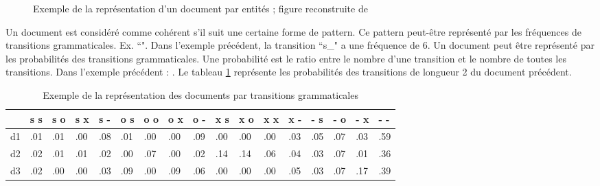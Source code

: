 \documentclass{KodeBook}
\begin{document}
\begin{figure}[!ht]
\begin{tabular}{ccccccccccccccccc}
	\end{tabular}
	
	\caption[Exemple de la représentation d'un document par entités]{Exemple de la représentation d'un document par entités ; figure reconstruite de \cite{2008-barzilay-lapata}}
	\label{fig:entity-grid-rep}
\end{figure}

%	

Un document est considéré comme cohérent s'il suit une certaine forme de pattern.
Ce pattern peut-être représenté par les fréquences de transitions grammaticales. Ex. ``".
Dans l'exemple précédent, la transition ``s\_" a une fréquence de 6.
Un document peut être représenté par les probabilités des transitions grammaticales.
Une probabilité est le ratio entre le nombre d'une transition et le nombre de toutes les transitions.
Dans l'exemple précédent : .
Le tableau \ref{tab:entity-grid-prob} représente les probabilités des transitions de longueur 2 du document précédent.

\begin{table}[ht]
	\centering
	\begin{tabular}{lllllllllllllllll}
		\hline
		& s s & s o & s x & s - & o s & o o & o x & o - & x s & x o & x x & x - & - s & - o & - x & - - \\
		\hline
		d1 & .01 & .01 & .00 & .08 & .01 & .00 & .00 & .09 & .00 & .00 & .00 & .03 & .05 & .07 & .03 & .59 \\
		d2 & .02 & .01 & .01 & .02 & .00 & .07 & .00 & .02 & .14 & .14 & .06 & .04 & .03 & .07 & .01 & .36 \\
		d3 & .02 & .00 & .00 & .03 & .09 & .00 & .09 & .06 & .00 & .00 & .00 & .05 & .03 & .07 & .17 & .39 \\
		\hline
	\end{tabular}
	\caption[Exemple de la représentation des documents par transitions grammaticales]{Exemple de la représentation des documents par transitions grammaticales \cite{2008-barzilay-lapata}}
	\label{tab:entity-grid-prob}
\end{table}
\end{document}
